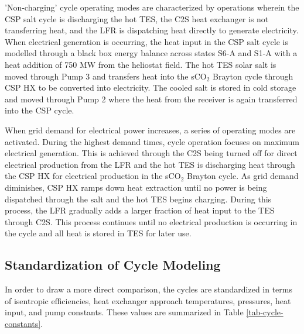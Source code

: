 \begin{paracol}{2}
'Non-charging' cycle operating modes are characterized by operations wherein the CSP salt cycle is discharging the hot TES, the C2S heat exchanger is not transferring heat, and the LFR is dispatching heat directly to generate electricity. When electrical generation is occurring, the heat input in the CSP salt cycle is modelled through a black box energy balance across states S6-A and S1-A with a heat addition of 750 MW from the heliostat field. The hot TES solar salt is moved through Pump 3 and transfers heat into the sCO$_{2}$ Brayton cycle through CSP HX to be converted into electricity. The cooled salt is stored in cold storage and moved through Pump 2 where the heat from the receiver is again transferred into the CSP cycle. 

When grid demand for electrical power increases, a series of operating modes are activated. During the highest demand times, cycle operation focuses on maximum electrical generation. This is achieved through the C2S being turned off for direct electrical production from the LFR and the hot TES is discharging heat through the CSP HX for electrical production in the sCO$_2$ Brayton cycle. As grid demand diminishes, CSP HX ramps down heat extraction until no power is being dispatched through the salt and the hot TES begins charging. During this process, the LFR gradually adds a larger fraction of heat input to the TES through C2S. This process continues until no electrical production is occurring in the cycle and all heat is stored in TES for later use.



\subsection{Standardization of Cycle Modeling}

In order to draw a more direct comparison, the cycles are standardized in terms of isentropic efficiencies, heat exchanger approach temperatures, pressures, heat input, and pump constants. These values are summarized in Table \ref{tab-cycle-constants}.


\end{paracol}
